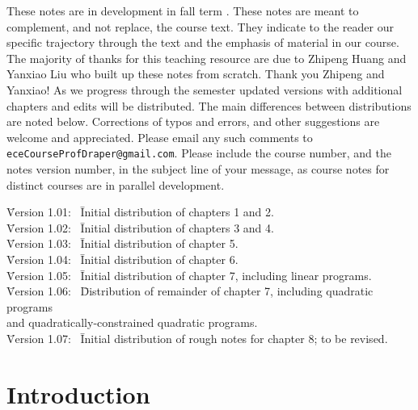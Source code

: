 \documentclass{tufte-book} %
\theoremstyle{definition}
\theoremstyle{remark}
\numberwithin{section}{chapter}
\numberwithin{equation}{chapter}
\numberwithin{figure}{chapter}
\begin{document}
\noindent These notes are in development in fall term \the\year.
These notes are meant to complement, and not replace, the course text.
They indicate to the reader our specific trajectory through the text
and the emphasis of material in our course.  The majority of thanks
for this teaching resource are due to Zhipeng Huang and Yanxiao Liu
who built up these notes from scratch.  Thank you Zhipeng and Yanxiao!
As we progress through the semester updated versions with additional
chapters and edits will be distributed.  The main differences between
distributions are noted below.  Corrections of typos and errors, and
other suggestions are welcome and appreciated.  Please email any such
comments to \texttt{eceCourseProfDraper@gmail.com}.  Please include
the course number, and the notes version number,  in the subject line of your message, as course notes
for distinct courses are in parallel development. \vspace{0.2in} \\

\begin{tabbing}
\noindent \= Version 1.01: \ \= Initial distribution of chapters 1 and 2.\\
\noindent \= Version 1.02: \ \= Initial distribution of chapters 3 and 4.\\
\noindent \= Version 1.03: \ \= Initial distribution of chapter 5.\\
\noindent \= Version 1.04: \ \= Initial distribution of chapter 6.\\
\noindent \= Version 1.05: \ \= Initial distribution of chapter 7, including linear programs.\\
\noindent \= Version 1.06: \ \= Distribution of remainder of chapter 7, including quadratic programs \\ \hspace{6em} and quadratically-constrained quadratic programs.\\
\noindent \= Version 1.07: \ \= Initial distribution of rough notes for chapter 8; to be revised.\\

\end{tabbing}

\newpage
\mainmatter


\chapter{Introduction}
\label{ch.intro}

\end{document}
